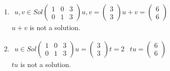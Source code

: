 \documentclass{article}
\begin{document}
\begin{enumerate}
\begin{enumerate}
\item

$
\begin{array}{cc}
u,v \in Sol
\left(\begin{array}{cc|c}
1 & 0 & 3\\
0 & 1 & 3
\end{array}\right)
u,v=
\left(\begin{array}{c}
3 \\ 3 \end{array}\right)
u+v=
\left(\begin{array}{c}
6 \\ 6 \end{array}\right)

\end{array}
$
\\
$u+v$ is not a solution.

\item

$
\begin{array}{cc}
u \in Sol
\left(\begin{array}{cc|c}
1 & 0 & 3\\
0 & 1 & 3
\end{array}\right)
u =
\left(\begin{array}{c}
3 \\ 3 \end{array}\right)
t = 2 &
tu=
\left(\begin{array}{c}
6 \\ 6 \end{array}\right)

\end{array}
$
\\
$tu$ is not a solution.

\end{enumerate}

\end{enumerate}
\end{document}
